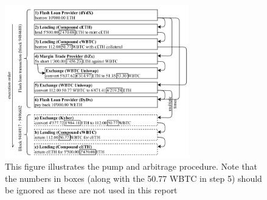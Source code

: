 \begin{figure}
  \centering
  \includegraphics[width=8cm]{assests/pump-and-arb}
  \caption{This figure illustrates the pump and arbitrage procedure. Note that the numbers in boxes (along with the 50.77 WBTC in step 5) should be ignored as these are not used in this report \cite[p. 5 fig. 6]{attack}}
  \label{fig:pumpAndArb}
\end{figure}
